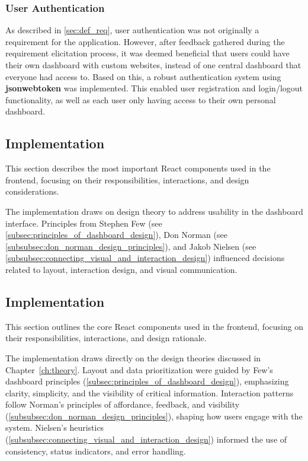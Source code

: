 \subsubsection{User Authentication}
As described in \autoref{sec:def_req}, user authentication was not originally a requirement for the application. However, after feedback gathered during the requirement elicitation process, it was deemed beneficial that users could have their own dashboard with custom websites, instead of one central dashboard that everyone had access to. Based on this, a robust authentication system using \textbf{\gls{jsonwebtoken}} was implemented. This enabled user registration and login/logout functionality, as well as each user only having access to their own personal dashboard.



\subsection{Implementation}
This section describes the most important React components used in the frontend, focusing on their responsibilities, interactions, and design considerations.

The implementation draws on design theory to address usability in the dashboard interface. Principles from Stephen Few (see \ref{subsec:principles_of_dashboard_design}), Don Norman (see \ref{subsubsec:don_norman_design_principles}), and Jakob Nielsen (see \ref{subsubsec:connecting_visual_and_interaction_design}) influenced decisions related to layout, interaction design, and visual communication.


\subsection{Implementation}
This section outlines the core React components used in the frontend, focusing on their responsibilities, interactions, and design rationale.

The implementation draws directly on the design theories discussed in Chapter~\ref{ch:theory}. Layout and data prioritization were guided by Few’s dashboard principles (\autoref{subsec:principles_of_dashboard_design}), emphasizing clarity, simplicity, and the visibility of critical information. Interaction patterns follow Norman’s principles of affordance, feedback, and visibility (\autoref{subsubsec:don_norman_design_principles}), shaping how users engage with the system. Nielsen’s heuristics (\autoref{subsubsec:connecting_visual_and_interaction_design}) informed the use of consistency, status indicators, and error handling.

